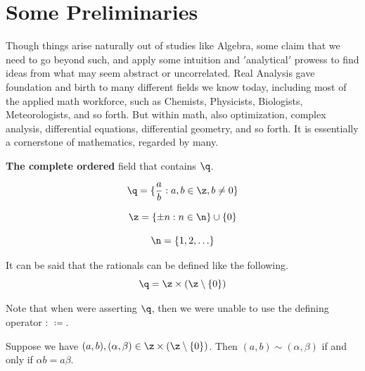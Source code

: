 
\section{Some Preliminaries}


Though things arise naturally out of studies like Algebra, some claim that we need to go beyond
such, and apply some intuition and \('\)analytical\('\) prowess to find ideas from what may seem
abstract or uncorrelated.
Real Analysis gave foundation and birth to many different fields we
know today, including most of the applied math workforce, such as Chemists, Physicists,
Biologists, Meteorologists, and so forth.
But within math, also optimization, complex analysis,
differential equations, differential geometry, and so forth.
It is essentially a cornerstone of
mathematics, regarded by many.

\begin{definition}
	\textbf{The complete ordered} field that contains $\q$.
\end{definition}

\begin{definition}
    \[\q = \{\dfrac{a}{b} : a,b\in\z, b\neq 0\}\]
\end{definition}

\begin{definition}[Integers]
	\[\z = \{\pm n : n\in\n\}\cup\{0\}\]
\end{definition}

\begin{definition}[Naturals]
	\[\n = \{1,2,\ldots\}\]
\end{definition}

\begin{example}
    It can be said that the rationals can be defined like the following.
	\[\q = \z\times (\z\setminus\{0\})\]
\end{example}

\begin{remark}
    Note that when were asserting $\q$, then we were unable to use the defining operator : $\coloneqq$.
\end{remark}

\begin{corollary}{
    Suppose we have $(a,b), (\alpha,\beta)\in\z\times(\z\setminus\{0\})$. Then $(a,b)\sim(\alpha,\beta)$ if and only if $\alpha b = a\beta$.
}
\end{corollary}

